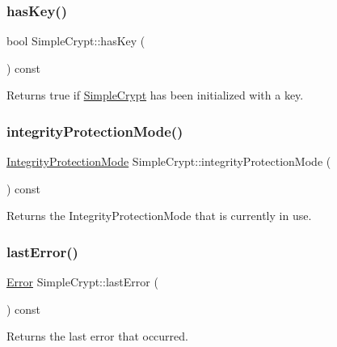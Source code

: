\subsubsection{\texorpdfstring{has\+Key()}{hasKey()}}
{\footnotesize\ttfamily bool Simple\+Crypt\+::has\+Key (\begin{DoxyParamCaption}{ }\end{DoxyParamCaption}) const\hspace{0.3cm}{\ttfamily [inline]}}

Returns true if \hyperlink{classSimpleCrypt}{Simple\+Crypt} has been initialized with a key. \mbox{\label{classSimpleCrypt_ac8940489ec63b0022335d9d6ab3b11a1}} 
\subsubsection{\texorpdfstring{integrity\+Protection\+Mode()}{integrityProtectionMode()}}
{\footnotesize\ttfamily \hyperlink{classSimpleCrypt_a42a5172e558d346b28421cc4e85feb2d}{Integrity\+Protection\+Mode} Simple\+Crypt\+::integrity\+Protection\+Mode (\begin{DoxyParamCaption}{ }\end{DoxyParamCaption}) const\hspace{0.3cm}{\ttfamily [inline]}}

Returns the Integrity\+Protection\+Mode that is currently in use. \mbox{\label{classSimpleCrypt_acb412b13386bf2bcb31552bc40949b39}} 
\subsubsection{\texorpdfstring{last\+Error()}{lastError()}}
{\footnotesize\ttfamily \hyperlink{classSimpleCrypt_ab7f81049e78f021b55a36f7cfac5a09b}{Error} Simple\+Crypt\+::last\+Error (\begin{DoxyParamCaption}{ }\end{DoxyParamCaption}) const\hspace{0.3cm}{\ttfamily [inline]}}

Returns the last error that occurred. \mbox{\label{classSimpleCrypt_adc6c6355aa276c0d3516f7ad273f063b}} 
